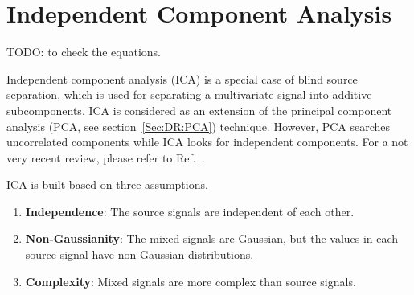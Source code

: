 \section{Independent Component Analysis\label{Sec:DR:ICA}}
TODO: to check the equations.

Independent component analysis (ICA) is a special case of blind source separation, which is used for separating a multivariate signal into additive subcomponents. ICA is considered as an extension of the principal component analysis (PCA, see section~\ref{Sec:DR:PCA}) technique. However, PCA searches uncorrelated components while ICA looks for independent components. For a not very recent review, please refer to Ref.~\cite{HyvarinenNN2000}.

ICA is built based on three assumptions. 
\begin{enumerate}
	\item \textbf{Independence}: The source signals are independent of each other.
	\item \textbf{Non-Gaussianity}: The mixed signals are Gaussian, but the values in each source signal have non-Gaussian distributions.
	\item \textbf{Complexity}: Mixed signals are more complex than source signals. 
\end{enumerate}

